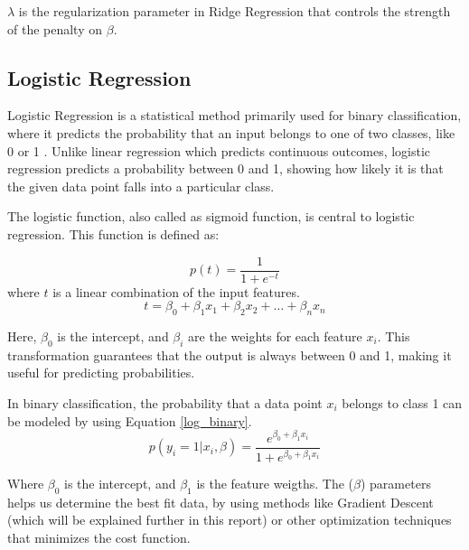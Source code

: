 \documentclass{article}
\newcommand{\0}{\mathbf{0}}
\newcommand{\1}{\mathbf{1}}
\begin{document}
\(\lambda\) is the regularization parameter in Ridge Regression that controls the strength of the penalty on \(\beta\). 








\subsection{Logistic Regression}


Logistic Regression is a statistical method primarily used for binary classification, where it predicts the probability that an input belongs to one of two classes, like 0 or 1 \cite{wikipedia_logistic_regression}. Unlike linear regression which predicts continuous outcomes, logistic regression predicts a probability between 0 and 1, showing how likely it is that the given data point falls into a particular class.

The logistic function, also called as sigmoid function, is central to logistic regression. This function is defined as: 

\begin{equation}
    p(t) = \frac{1}{1 + e^{-t}}
    \label{logistic_function}
\end{equation}
where \(t\) is a linear combination of the input features. 
\begin{equation}
t = \beta_0 + \beta_1 x_1 + \beta_2 x_2 + \dots + \beta_n x_n
\end{equation}

Here, \( \beta_0 \) is the intercept, and \( \beta_i \) are the weights for each feature \( x_i \). This transformation guarantees that the output is always between 0 and 1, making it useful for predicting probabilities. 




In binary classification, the probability that a data point \( x_i \) belongs to class 1 can be modeled by using Equation \ref{log_binary}.
\begin{equation}
p(y_i = 1 | x_i, \beta) = \frac{e^{\beta_0 + \beta_1 x_i}}{1 + e^{\beta_0 + \beta_1 x_i}}
\label{log_binary}
\end{equation}

Where \( \beta_0 \) is the intercept, and \( \beta_1 \) is the feature weigths. The (\( \beta \)) parameters helps us determine the  best fit data, by using methods like Gradient Descent (which will be explained further in this report) or other optimization techniques that minimizes the cost function.
\end{document}
